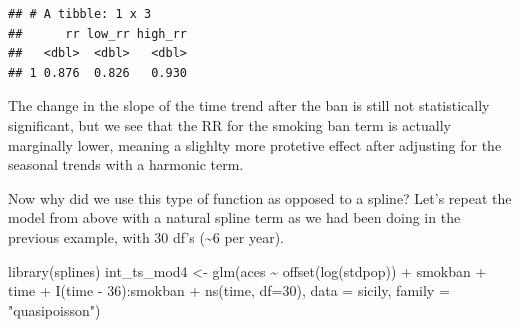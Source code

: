 \documentclass[
]{book}
\newenvironment{Shaded}{\begin{snugshade}}{\end{snugshade}}
\newcommand{\AttributeTok}[1]{\textcolor[rgb]{0.77,0.63,0.00}{#1}}
\newcommand{\DecValTok}[1]{\textcolor[rgb]{0.00,0.00,0.81}{#1}}
\newcommand{\FunctionTok}[1]{\textcolor[rgb]{0.00,0.00,0.00}{#1}}
\newcommand{\NormalTok}[1]{#1}
\newcommand{\OtherTok}[1]{\textcolor[rgb]{0.56,0.35,0.01}{#1}}
\newcommand{\SpecialCharTok}[1]{\textcolor[rgb]{0.00,0.00,0.00}{#1}}
\newcommand{\StringTok}[1]{\textcolor[rgb]{0.31,0.60,0.02}{#1}}
\begin{document}
\begin{verbatim}
## # A tibble: 1 x 3
##      rr low_rr high_rr
##   <dbl>  <dbl>   <dbl>
## 1 0.876  0.826   0.930
\end{verbatim}

The change in the slope of the time trend after the ban is still not statistically significant, but we see that the RR for the smoking ban term is actually marginally lower, meaning a slighlty more protetive effect after adjusting for the seasonal trends with a harmonic term.

Now why did we use this type of function as opposed to a spline? Let's repeat the model from above with a natural spline term as we had been doing in the previous example, with 30 df's (\textasciitilde6 per year).

\begin{Shaded}
\begin{Highlighting}[]
\FunctionTok{library}\NormalTok{(splines)}
\NormalTok{int\_ts\_mod4 }\OtherTok{\textless{}{-}} \FunctionTok{glm}\NormalTok{(aces }\SpecialCharTok{\textasciitilde{}} \FunctionTok{offset}\NormalTok{(}\FunctionTok{log}\NormalTok{(stdpop)) }\SpecialCharTok{+}\NormalTok{ smokban }\SpecialCharTok{+}\NormalTok{ time }\SpecialCharTok{+} 
                     \FunctionTok{I}\NormalTok{(time }\SpecialCharTok{{-}} \DecValTok{36}\NormalTok{)}\SpecialCharTok{:}\NormalTok{smokban }\SpecialCharTok{+} \FunctionTok{ns}\NormalTok{(time, }\AttributeTok{df=}\DecValTok{30}\NormalTok{), }
                      \AttributeTok{data =}\NormalTok{ sicily, }
                      \AttributeTok{family =} \StringTok{"quasipoisson"}\NormalTok{)}
\end{Highlighting}
\end{Shaded}
\end{document}
